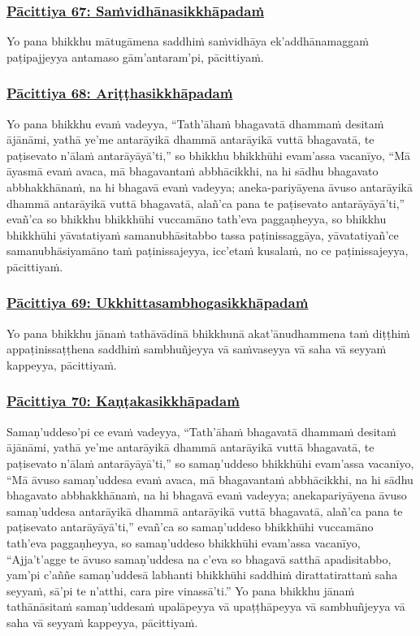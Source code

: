 \subsubsection*{\hyperref[exp67]{Pācittiya 67: Saṁvidhānasikkhāpadaṁ}}
\label{pac67}
Yo pana bhikkhu mātugāmena saddhiṁ saṁvidhāya ek'addhānamaggaṁ paṭipajjeyya antamaso gām'antaram'pi, pācittiyaṁ.

\subsubsection*{\hyperref[exp68]{Pācittiya 68: Ariṭṭhasikkhāpadaṁ}}
\label{pac68}
Yo pana bhikkhu evaṁ vadeyya, ``Tath'āhaṁ bhagavatā dhammaṁ desitaṁ ājānāmi, yathā ye'me antarāyikā dhammā antarāyikā vuttā bhagavatā, te paṭisevato n'ālaṁ antarāyāyā'ti,'' so bhikkhu bhikkhūhi evam'assa vacanīyo, ``Mā āyasmā evaṁ avaca, mā bhagavantaṁ abbhācikkhi, na hi sādhu bhagavato abbhakkhānaṁ, na hi bhagavā evaṁ vadeyya; aneka-pariyāyena āvuso antarāyikā dhammā antarāyikā vuttā bhagavatā, alañ'ca pana te paṭisevato antarāyāyā'ti,'' evañ'ca so bhikkhu bhikkhūhi vuccamāno tath'eva paggaṇheyya, so bhikkhu bhikkhūhi yāvatatiyaṁ samanubhāsitabbo tassa paṭinissaggāya, yāvatatiyañ'ce samanubhāsiyamāno taṁ paṭinissajeyya, icc'etaṁ kusalaṁ, no ce paṭinissajeyya, pācittiyaṁ.

\subsubsection*{\hyperref[exp69]{Pācittiya 69: Ukkhittasambhogasikkhāpadaṁ}}
\label{pac69}
Yo pana bhikkhu jānaṁ tathāvādinā bhikkhunā akat'ānudhammena taṁ diṭṭhiṁ appaṭinissaṭṭhena saddhiṁ sambhuñjeyya vā saṁvaseyya vā saha vā seyyaṁ kappeyya, pācittiyaṁ.

\subsubsection*{\hyperref[exp70]{Pācittiya 70: Kaṇṭakasikkhāpadaṁ}}
\label{pac70}
Samaṇ'uddeso'pi ce evaṁ vadeyya, ``Tath'āhaṁ bhagavatā dhammaṁ desitaṁ ājānāmi, yathā ye'me antarāyikā dhammā antarāyikā vuttā bhagavatā, te paṭisevato n'ālaṁ antarāyāyā'ti,'' so samaṇ'uddeso bhikkhūhi evam'assa vacanīyo, ``Mā āvuso samaṇ'uddesa evaṁ avaca, mā bhagavantaṁ abbhācikkhi, na hi sādhu bhagavato abbhakkhānaṁ, na hi bhagavā evaṁ vadeyya; anekapariyāyena āvuso samaṇ'uddesa antarāyikā dhammā antarāyikā vuttā bhagavatā, alañ'ca pana te paṭisevato antarāyāyā'ti,'' evañ'ca so samaṇ'uddeso bhikkhūhi vuccamāno tath'eva paggaṇheyya, so samaṇ'uddeso bhikkhūhi evam'assa vacanīyo, ``Ajja't'agge te āvuso samaṇ'uddesa na c'eva so bhagavā satthā apadisitabbo, yam'pi c'aññe samaṇ'uddesā labhanti bhikkhūhi saddhiṁ dirattatirattaṁ saha seyyaṁ, sā'pi te n'atthi, cara pire vinassā'ti.'' Yo pana bhikkhu jānaṁ tathānāsitaṁ samaṇ'uddesaṁ upalāpeyya vā upaṭṭhāpeyya vā sambhuñjeyya vā saha vā seyyaṁ kappeyya, pācittiyaṁ.

